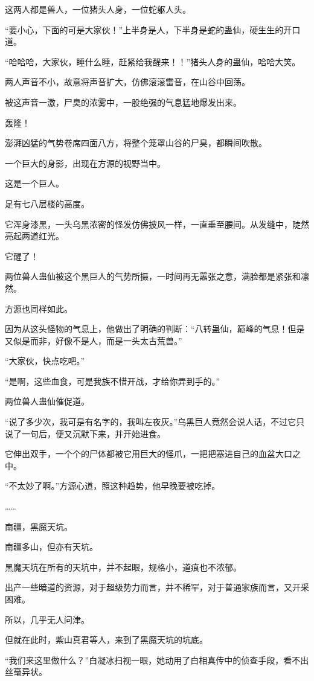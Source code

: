 \begin{this_body}
这两人都是兽人，一位猪头人身，一位蛇躯人头。

“要小心，下面的可是大家伙！”上半身是人，下半身是蛇的蛊仙，硬生生的开口道。

“哈哈哈，大家伙，睡什么睡，赶紧给我醒来！！”猪头人身的蛊仙，哈哈大笑。

两人声音不小，故意将声音扩大，仿佛滚滚雷音，在山谷中回荡。

被这声音一激，尸臭的浓雾中，一股绝强的气息猛地爆发出来。

轰隆！

澎湃凶猛的气势卷席四面八方，将整个笼罩山谷的尸臭，都瞬间吹散。

一个巨大的身影，出现在方源的视野当中。

这是一个巨人。

足有七八层楼的高度。

它浑身漆黑，一头乌黑浓密的怪发仿佛披风一样，一直垂至腰间。从发缝中，陡然亮起两道红光。

它醒了！

两位兽人蛊仙被这个黑巨人的气势所摄，一时间再无嚣张之意，满脸都是紧张和凛然。

方源也同样如此。

因为从这头怪物的气息上，他做出了明确的判断：“八转蛊仙，巅峰的气息！但是又似是而非，好像不是人，而是一头太古荒兽。”

“大家伙，快点吃吧。”

“是啊，这些血食，可是我族不惜开战，才给你弄到手的。”

两位兽人蛊仙催促道。

“说了多少次，我可是有名字的，我叫左夜灰。”乌黑巨人竟然会说人话，不过它只说了一句后，便又沉默下来，并开始进食。

它伸出双手，一个个的尸体都被它用巨大的怪爪，一把把塞进自己的血盆大口之中。

“不太妙了啊。”方源心道，照这种趋势，他早晚要被吃掉。

……

南疆，黑魔天坑。

南疆多山，但亦有天坑。

黑魔天坑在所有的天坑中，并不起眼，规格小，道痕也不浓郁。

出产一些暗道的资源，对于超级势力而言，并不稀罕，对于普通家族而言，又开采困难。

所以，几乎无人问津。

但就在此时，紫山真君等人，来到了黑魔天坑的坑底。

“我们来这里做什么？”白凝冰扫视一眼，她动用了白相真传中的侦查手段，看不出丝毫异状。


\end{this_body}
